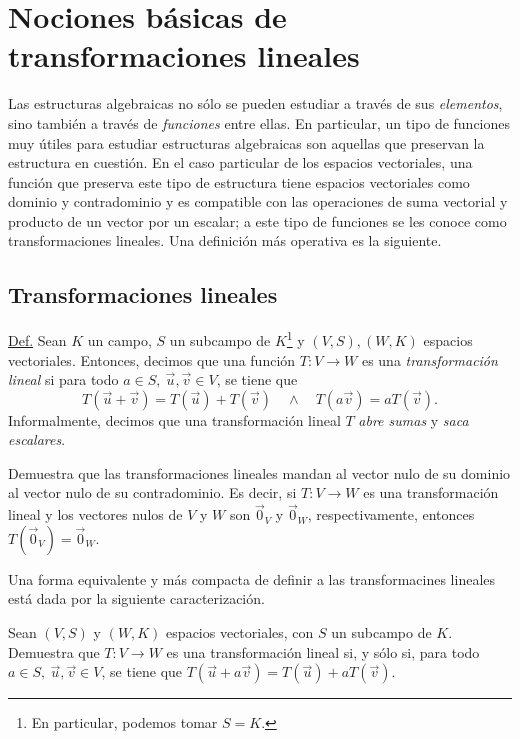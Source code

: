 \documentclass[notasLineal]{subfiles}
\begin{document}
\section{Nociones básicas de transformaciones lineales} \label{Sec: Nociones básicas de transformaciones lineales}

Las estructuras algebraicas no sólo se pueden estudiar a través de sus \emph{elementos}, sino también a través de \emph{funciones} entre ellas. En particular, un tipo de funciones muy útiles para estudiar estructuras algebraicas son aquellas que preservan la estructura en cuestión. En el caso particular de los espacios vectoriales, una función que preserva este tipo de estructura tiene espacios vectoriales como dominio y contradominio y es compatible con las operaciones de suma vectorial y producto de un vector por un escalar; a este tipo de funciones se les conoce como transformaciones lineales. Una definición más operativa es la siguiente.

\subsection*{Transformaciones lineales} \label{Ssec: Definición de transformación lineal}

\begin{tcolorbox}
\underline{Def.} Sean $K$ un campo, $S$ un subcampo de $K$\footnote{En particular, podemos tomar $S=K$.} y $(V,S), (W,K)$ espacios vectoriales. Entonces, decimos que una función $T:V\to W$ es una \emph{transformación lineal} si para todo $a\in S, \ \vec{u},\vec{v}\in V$, se tiene que
\[
T(\vec{u}+\vec{v}) = T(\vec{u})+T(\vec{v}) \quad \land \quad T(a\vec{v}) = aT(\vec{v}).
\]
Informalmente, decimos que una transformación lineal $T$ \emph{abre sumas} y \emph{saca escalares}.
\end{tcolorbox}

\begin{Ejer}\label{ejer-16}
    Demuestra que las transformaciones lineales mandan al vector nulo de su dominio al vector nulo de su contradominio. Es decir, si $T:V\to W$ es una transformación lineal y los vectores nulos de $V$ y $W$ son $\vec{0}_V$ y $\vec{0}_W$, respectivamente, entonces $T(\vec{0}_V) = \vec{0}_W$.
\end{Ejer}

Una forma equivalente y más compacta de definir a las transformacines lineales está dada por la siguiente caracterización.

\begin{Ejer}\label{ejer:17}
Sean $(V,S)$ y $(W,K)$ espacios vectoriales, con $S$ un subcampo de $K$. Demuestra que $T:V\to W$ es una transformación lineal si, y sólo si, para todo $a\in S, \ \vec{u},\vec{v}\in V$, se tiene que $T(\vec{u}+a\vec{v}) = T(\vec{u})+aT(\vec{v})$.
\end{Ejer}
\end{document}
